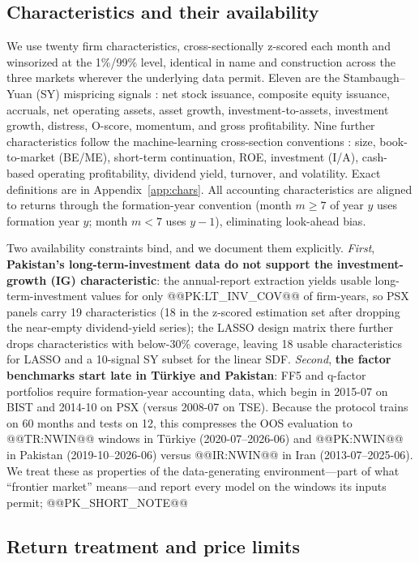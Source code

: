 \documentclass[12pt]{article}
\begin{document}
\subsection{Characteristics and their availability}\label{sec:chars}

We use twenty firm characteristics, cross-sectionally z-scored each month and winsorized at the 1\%/99\% level, identical in name and construction across the three markets wherever the underlying data permit. Eleven are the Stambaugh--Yuan (SY) mispricing signals \citep{sy2017}: net stock issuance, composite equity issuance, accruals, net operating assets, asset growth, investment-to-assets, investment growth, distress, O-score, momentum, and gross profitability. Nine further characteristics follow the machine-learning cross-section conventions \citep{gkx2020,cpz2024}: size, book-to-market (BE/ME), short-term continuation, ROE, investment (I/A), cash-based operating profitability, dividend yield, turnover, and volatility. Exact definitions are in Appendix~\ref{app:chars}. All accounting characteristics are aligned to returns through the formation-year convention (month $m\ge7$ of year $y$ uses formation year $y$; month $m<7$ uses $y-1$), eliminating look-ahead bias.

Two availability constraints bind, and we document them explicitly. \emph{First}, \textbf{Pakistan's long-term-investment data do not support the investment-growth (IG) characteristic}: the annual-report extraction yields usable long-term-investment values for only @@PK:LT_INV_COV@@ of firm-years, so PSX panels carry 19 characteristics (18 in the z-scored estimation set after dropping the near-empty dividend-yield series); the LASSO design matrix there further drops characteristics with below-30\% coverage, leaving 18 usable characteristics for LASSO and a 10-signal SY subset for the linear SDF. \emph{Second}, \textbf{the factor benchmarks start late in T\"urkiye and Pakistan}: FF5 and q-factor portfolios require formation-year accounting data, which begin in 2015-07 on BIST and 2014-10 on PSX (versus 2008-07 on TSE). Because the protocol trains on 60 months and tests on 12, this compresses the OOS evaluation to @@TR:NWIN@@ windows in T\"urkiye (2020-07--2026-06) and @@PK:NWIN@@ in Pakistan (2019-10--2026-06) versus @@IR:NWIN@@ in Iran (2013-07--2025-06). We treat these as properties of the data-generating environment---part of what ``frontier market'' means---and report every model on the windows its inputs permit; @@PK_SHORT_NOTE@@

\subsection{Return treatment and price limits}
\end{document}
